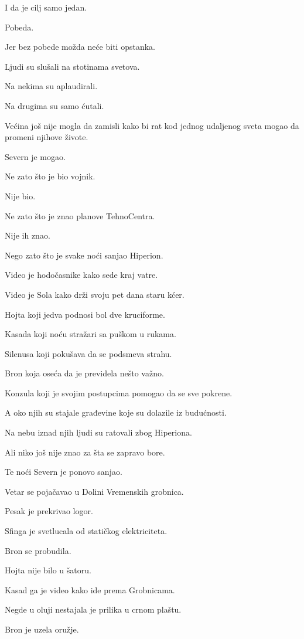 I da je cilj samo jedan.

Pobeda.

Jer bez pobede možda neće biti opstanka.

\bigskip

Ljudi su slušali na stotinama svetova.

Na nekima su aplaudirali.

Na drugima su samo ćutali.

Većina još nije mogla da zamisli kako bi rat kod jednog udaljenog sveta mogao da promeni njihove živote.

Severn je mogao.

Ne zato što je bio vojnik.

Nije bio.

Ne zato što je znao planove TehnoCentra.

Nije ih znao.

Nego zato što je svake noći sanjao Hiperion.

Video je hodočasnike kako sede kraj vatre.

Video je Sola kako drži svoju pet dana staru kćer.

Hojta koji jedva podnosi bol dve kruciforme.

Kasada koji noću stražari sa puškom u rukama.

Silenusa koji pokušava da se podsmeva strahu.

Bron koja oseća da je previdela nešto važno.

Konzula koji je svojim postupcima pomogao da se sve pokrene.

A oko njih su stajale građevine koje su dolazile iz budućnosti.

Na nebu iznad njih ljudi su ratovali zbog Hiperiona.

Ali niko još nije znao za šta se zapravo bore.

\bigskip

Te noći Severn je ponovo sanjao.

Vetar se pojačavao u Dolini Vremenskih grobnica.

Pesak je prekrivao logor.

Sfinga je svetlucala od statičkog elektriciteta.

Bron se probudila.

Hojta nije bilo u šatoru.

Kasad ga je video kako ide prema Grobnicama.

Negde u oluji nestajala je prilika u crnom plaštu.

Bron je uzela oružje.

